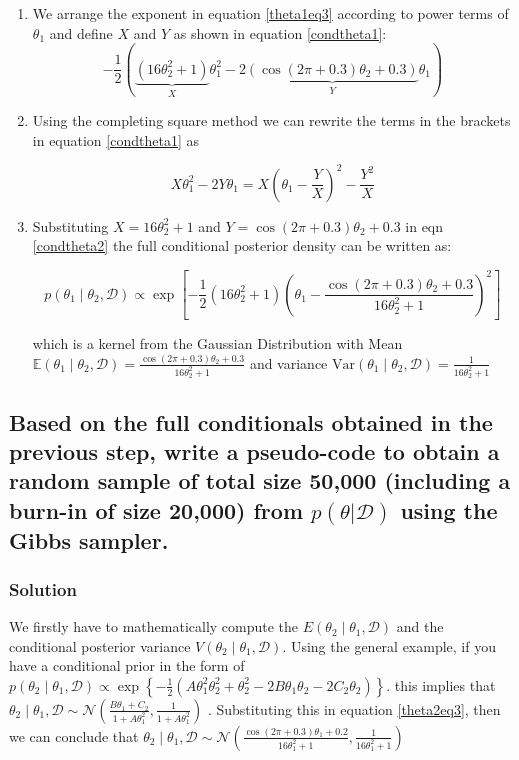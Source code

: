 \documentclass[12pt]{article}
\begin{document}
\begin{enumerate}
\item We arrange the exponent in equation \ref{theta1eq3} according to power terms of $\theta_1$ and define $X$ and $Y$ as shown in equation \ref{condtheta1}:
\begin{equation}\label{condtheta1}
-\frac{1}{2} \left( \underbrace{(16\theta_2^2 + 1)}_{X}\theta_1^2 - 2\underbrace{\left(\cos(2\pi + 0.3)\theta_2 + 0.3\right)}_{Y}\theta_1 \right)
\end{equation}

\item Using the completing square method we can rewrite the terms in the brackets in equation \ref{condtheta1} as 

\begin{equation}\label{condtheta2}
     X\theta_1^2 - 2Y\theta_1 = X\left(\theta_1 - \frac{Y}{X}\right)^2 - \frac{Y^2}{X}
\end{equation}
\item Substituting \( X = 16\theta_2^2 + 1 \) and \( Y = \cos(2\pi + 0.3)\theta_2 + 0.3 \) in eqn \ref{condtheta2} the full conditional posterior density  can be written as:

\begin{equation} \label{condtheta3}
p(\theta_1 \mid \theta_2, \mathcal{D}) \propto \exp\left[-\frac{1}{2}(16\theta_2^2 + 1)\left(\theta_1 - \frac{\cos(2\pi + 0.3)\theta_2 + 0.3}{16\theta_2^2 + 1}\right)^2\right]
\end{equation}

which is a kernel from the Gaussian Distribution with Mean   $\mathbb{E}(\theta_1 \mid \theta_2, \mathcal{D}) = \frac{\cos(2\pi + 0.3)\theta_2 + 0.3}{16\theta_2^2 + 1}$ and variance  $  \mathrm{Var}(\theta_1 \mid \theta_2, \mathcal{D}) = \frac{1}{16\theta_2^2 + 1}$
\end{enumerate}
\subsection{ Based on the full conditionals obtained in the previous step, write a pseudo-code to obtain a random sample of total size 50,000 (including a burn-in of size 20,000) from $p(\theta | \mathcal{D})$ using the Gibbs sampler.} 
\subsubsection{Solution}
We firstly have to mathematically compute the \(E(\theta_2 \mid \theta_1, \mathcal{D})\) and the conditional posterior variance \(V(\theta_2 \mid \theta_1, \mathcal{D})\). Using the general example, if you have a conditional prior in the form of $
p(\theta_2 \mid \theta_1, \mathcal{D}) \propto \exp\left\{ -\frac{1}{2} \left( A\theta_1^2\theta_2^2 + \theta_2^2 - 2B\theta_1\theta_2 - 2C_2\theta_2 \right) \right\}.
$ this implies that$\theta_2 \mid \theta_1, \mathcal{D} \sim \mathcal{N} \left( \frac{B\theta_1 + C_2}{1 + A\theta_1^2}, \frac{1}{1 + A\theta_1^2} \right)$ \cite{gelman1995bayesian} \cite{author2024notes}. Substituting this in equation \ref{theta2eq3}, then we can conclude that $\theta_2 \mid \theta_1, \mathcal{D} \sim \mathcal{N} \left( \frac{\cos(2\pi + 0.3)\theta_1 + 0.2}{16\theta_1^2 + 1}, \frac{1}{16\theta_1^2 + 1}\right)$ 
\end{document}
